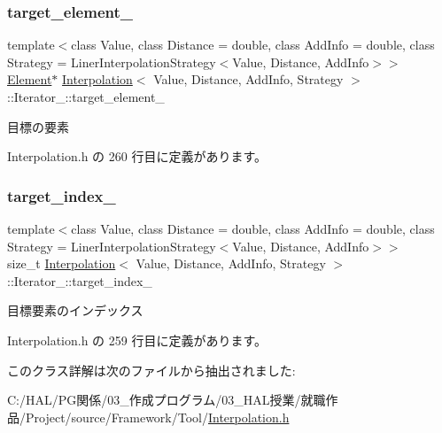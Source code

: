 \subsubsection{\texorpdfstring{target\+\_\+element\+\_\+}{target\_element\_}}
{\footnotesize\ttfamily template$<$class Value, class Distance = double, class Add\+Info = double, class Strategy = Liner\+Interpolation\+Strategy$<$\+Value, Distance, Add\+Info$>$$>$ \\
\mbox{\hyperlink{class_interpolation_a01e71544809483d7a2ee72fe0007bcb0}{Element}}$\ast$ \mbox{\hyperlink{class_interpolation}{Interpolation}}$<$ Value, Distance, Add\+Info, Strategy $>$\+::Iterator\+\_\+\+::target\+\_\+element\+\_\+\hspace{0.3cm}{\ttfamily [private]}}



目標の要素 



 Interpolation.\+h の 260 行目に定義があります。

\mbox{\label{class_interpolation_1_1_iterator___abe644d37f27f54fb28f6e9c117f651d5}} 
\subsubsection{\texorpdfstring{target\+\_\+index\+\_\+}{target\_index\_}}
{\footnotesize\ttfamily template$<$class Value, class Distance = double, class Add\+Info = double, class Strategy = Liner\+Interpolation\+Strategy$<$\+Value, Distance, Add\+Info$>$$>$ \\
size\+\_\+t \mbox{\hyperlink{class_interpolation}{Interpolation}}$<$ Value, Distance, Add\+Info, Strategy $>$\+::Iterator\+\_\+\+::target\+\_\+index\+\_\+\hspace{0.3cm}{\ttfamily [private]}}



目標要素のインデックス 



 Interpolation.\+h の 259 行目に定義があります。



このクラス詳解は次のファイルから抽出されました\+:\begin{DoxyCompactItemize}
\item 
C\+:/\+H\+A\+L/\+P\+G関係/03\+\_\+作成プログラム/03\+\_\+\+H\+A\+L授業/就職作品/\+Project/source/\+Framework/\+Tool/\mbox{\hyperlink{_interpolation_8h}{Interpolation.\+h}}\end{DoxyCompactItemize}

